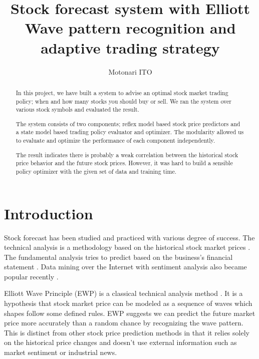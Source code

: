 \documentclass[twocolumn,10pt]{asme2ej}
\begin{document}
\title{Stock forecast system with Elliott Wave pattern recognition and adaptive trading strategy}
\author{Motonari ITO
}

\maketitle

\begin{abstract}
  In this project, we have built a system to advise an optimal stock market
  trading policy; when and how many stocks you should buy or sell. We ran the
  system over various stock symbols and evaluated the result.

  The system consists of two components; reflex model based stock price
  predictors and a state model based trading policy evaluator and optimizer. The
  modularity allowed us to evaluate and optimize the performance of each
  component independently.
  
  The result indicates there is probably a weak correlation between the
  historical stock price behavior and the future stock prices. However, it was
  hard to build a sensible policy optimizer with the given set of data and
  training time.
\end{abstract}

\section{Introduction}

Stock forecast has been studied and practiced with various degree of
success. The technical analysis is a methodology based on the
historical stock market prices \cite{wiki:technical_analysis}. The
fundamental analysis tries to predict based on the business's
financial statement \cite{wiki:fundamental_analysis}. Data mining over
the Internet with sentiment analysis also became popular recently
\cite{web:data_mining_analysis}.

Elliott Wave Principle (EWP) is a classical technical analysis method
\cite{frost1981elliott, web:study_of_cycles}. It is a hypothesis that stock
market price can be modeled as a sequence of waves which shapes follow some
defined rules. EWP suggests we can predict the future market price more
accurately than a random chance by recognizing the wave pattern.  This is
distinct from other stock price prediction methods in that it relies solely on
the historical price changes and doesn't use external information such as market
sentiment or industrial news.
\end{document}
